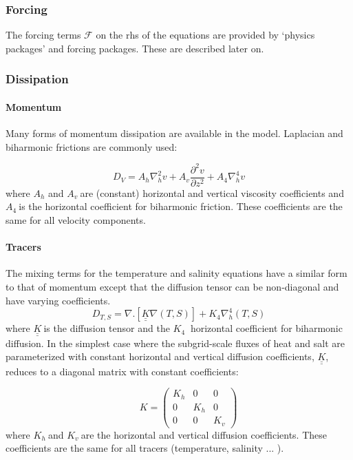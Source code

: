 \subsubsection{Forcing}

The forcing terms $\mathcal{F}$ on the rhs of the equations are provided by
`physics packages' and forcing packages. These are described later on.

\subsubsection{Dissipation}

\paragraph{Momentum}

Many forms of momentum dissipation are available in the model. Laplacian and
biharmonic frictions are commonly used:

\begin{equation}
D_{V}=A_{h}\nabla _{h}^{2}v+A_{v}\frac{\partial ^{2}v}{\partial z^{2}}
+A_{4}\nabla _{h}^{4}v  \label{eq:dissipation}
\end{equation}
where $A_{h}$ and $A_{v}\ $are (constant) horizontal and vertical viscosity
coefficients and $A_{4}\ $is the horizontal coefficient for biharmonic
friction. These coefficients are the same for all velocity components.

\paragraph{Tracers}

The mixing terms for the temperature and salinity equations have a similar
form to that of momentum except that the diffusion tensor can be
non-diagonal and have varying coefficients. $\qquad $
\begin{equation}
D_{T,S}=\nabla .[\underline{\underline{K}}\nabla (T,S)]+K_{4}\nabla
_{h}^{4}(T,S)  \label{eq:diffusion}
\end{equation}
where $\underline{\underline{K}}\ $is the diffusion tensor and the $K_{4}\ $
horizontal coefficient for biharmonic diffusion. In the simplest case where
the subgrid-scale fluxes of heat and salt are parameterized with constant
horizontal and vertical diffusion coefficients, $\underline{\underline{K}}$,
reduces to a diagonal matrix with constant coefficients:

\begin{equation}
\qquad \qquad \qquad \qquad K=\left( 
\begin{array}{ccc}
K_{h} & 0 & 0 \\ 
0 & K_{h} & 0 \\ 
0 & 0 & K_{v}
\end{array}
\right) \qquad \qquad \qquad  \label{eq:diagonal-diffusion-tensor}
\end{equation}
where $K_{h}\ $and $K_{v}\ $are the horizontal and vertical diffusion
coefficients. These coefficients are the same for all tracers (temperature,
salinity ... ).

